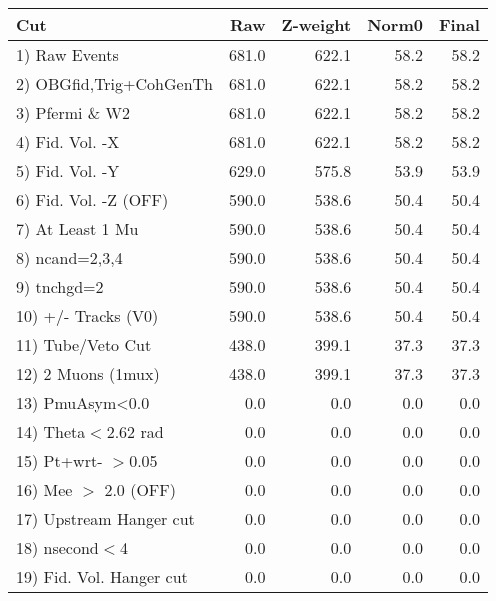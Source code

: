  \begin{table}[h!]\centering
 \begin{tabular}{||l||r|r|r|r||}
 \hline
 \hline
 Cut & Raw & Z-weight & Norm0 & Final \\
 \hline
  1) Raw Events           &       681.0 &       622.1 &        58.2 &        58.2 \\
  2) OBGfid,Trig+CohGenTh &       681.0 &       622.1 &        58.2 &        58.2 \\
  3) Pfermi \& W2         &       681.0 &       622.1 &        58.2 &        58.2 \\
  4) Fid. Vol. -X         &       681.0 &       622.1 &        58.2 &        58.2 \\
  5) Fid. Vol. -Y         &       629.0 &       575.8 &        53.9 &        53.9 \\
  6) Fid. Vol. -Z (OFF)   &       590.0 &       538.6 &        50.4 &        50.4 \\
  7) At Least 1 Mu        &       590.0 &       538.6 &        50.4 &        50.4 \\
  8) ncand=2,3,4          &       590.0 &       538.6 &        50.4 &        50.4 \\
  9) tnchgd=2             &       590.0 &       538.6 &        50.4 &        50.4 \\
 10) +/- Tracks (V0)      &       590.0 &       538.6 &        50.4 &        50.4 \\
 11) Tube/Veto Cut        &       438.0 &       399.1 &        37.3 &        37.3 \\
 12) 2 Muons (1mux)       &       438.0 &       399.1 &        37.3 &        37.3 \\
 13) PmuAsym<0.0          &         0.0 &         0.0 &         0.0 &         0.0 \\
 14) Theta$<$2.62 rad     &         0.0 &         0.0 &         0.0 &         0.0 \\
 15) Pt+wrt- $>$0.05      &         0.0 &         0.0 &         0.0 &         0.0 \\
 16) Mee $>$ 2.0  (OFF)   &         0.0 &         0.0 &         0.0 &         0.0 \\
 17) Upstream Hanger cut  &         0.0 &         0.0 &         0.0 &         0.0 \\
 18) nsecond$<$4          &         0.0 &         0.0 &         0.0 &         0.0 \\
 19) Fid. Vol. Hanger cut &         0.0 &         0.0 &         0.0 &         0.0 \\

\end{tabular}
\end{table}
